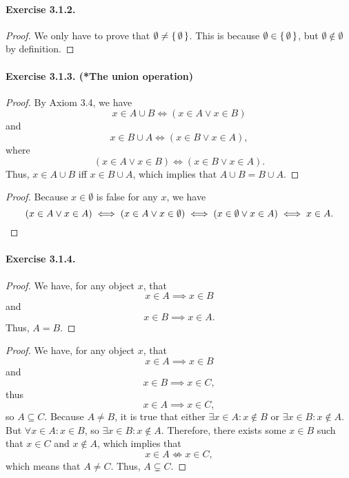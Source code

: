 \paragraph{Exercise 3.1.2.}
\begin{proof}
    We only have to prove that $\emptyset \neq \set{\emptyset}$. This is because $\emptyset \in \set{\emptyset}$, but $\emptyset \notin \emptyset$ by definition.
\end{proof}

\paragraph{Exercise 3.1.3. (*The union operation)}
\begin{proof}
    By Axiom 3.4, we have \[x\in A\cup B \iff (x\in A \lor x\in B)\] and \[x\in B\cup A \iff (x\in B \lor x\in A),\] where \[(x\in A \lor x\in B) \iff (x\in B \lor x\in A).\] Thus, $x\in A\cup B$ iff $x\in B\cup A$, which implies that $A\cup B=B\cup A$.
\end{proof}
\begin{proof}
    Because $x\in \emptyset$ is false for any $x$, we have \[(x\in A \lor x\in A) \iff (x\in A \lor x\in \emptyset) \iff (x\in \emptyset \lor x\in A) \iff x\in A. \qedhere\]
\end{proof}

\paragraph{Exercise 3.1.4.}
\begin{proof}
    We have, for any object $x$, that \[ x\in A \implies x \in B \] and \[ x\in B \implies x \in A .\] Thus, $A=B$.
\end{proof}
\begin{proof}
    We have, for any object $x$, that \[ x\in A \implies x \in B \] and \[ x\in B \implies x \in C , \] thus \[ x\in A \implies x \in C ,\] so $A\subseteq C$. Because $A\neq B$, it is true that either $\exists x\in A: x\notin B$ or $\exists x\in B: x\notin A$. But $\forall x\in A: x \in B$, so $\exists x\in B: x\notin A$. Therefore, there exists some $x\in B$ such that $x\in C$ and $x\notin A$, which implies that \[ x\in A \not\iff x\in C ,\] which means that $A\neq C$. Thus, $A\subsetneq C$.
\end{proof}

